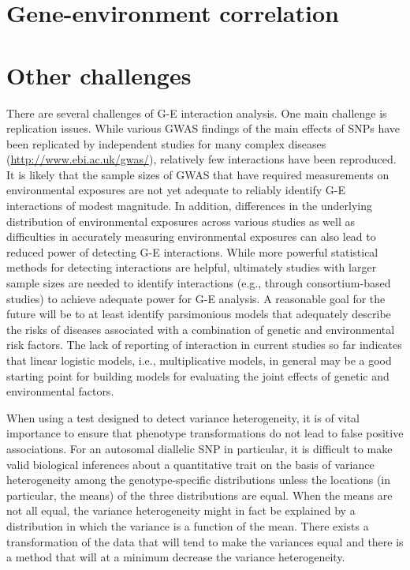 \documentclass[
]{book}
\begin{document}
\hypertarget{gene-environment-correlation}{%
\section{Gene-environment correlation}\label{gene-environment-correlation}}

\hypertarget{other-challenges}{%
\section{Other challenges}\label{other-challenges}}

There are several challenges of G-E interaction analysis. One main challenge is replication issues. While various GWAS findings of the main effects of SNPs have been replicated by independent studies for many complex diseases (\url{http://www.ebi.ac.uk/gwas/}), relatively few interactions have been reproduced. It is likely that the sample sizes of GWAS that have required measurements on environmental exposures are not yet adequate to reliably identify G-E interactions of modest magnitude. In addition, differences in the underlying distribution of environmental exposures across various studies as well as difficulties in accurately measuring environmental exposures can also lead to reduced power of detecting G-E interactions. While more powerful statistical methods for detecting interactions are helpful, ultimately studies with larger sample sizes are needed to identify interactions (e.g., through consortium-based studies) to achieve adequate power for G-E analysis. A reasonable goal for the future will be to at least identify parsimonious models that adequately describe the risks of diseases associated with a combination of genetic and environmental risk factors. The lack of reporting of interaction in current studies so far indicates that linear logistic models, i.e., multiplicative models, in general may be a good starting point for building models for evaluating the joint effects of genetic and environmental factors.

When using a test designed to detect variance heterogeneity, it is of vital importance to ensure that phenotype transformations do not lead to false positive associations. For an autosomal diallelic SNP in particular, it is difficult to make valid biological inferences about a quantitative trait on the basis of variance heterogeneity among the genotype-specific distributions unless the locations (in particular, the means) of the three distributions are equal. When the means are not all equal, the variance heterogeneity might in fact be explained by a distribution in which the variance is a function of the mean. There exists a transformation of the data that will tend to make the variances equal and there is a method that will at a minimum decrease the variance heterogeneity.
\end{document}
